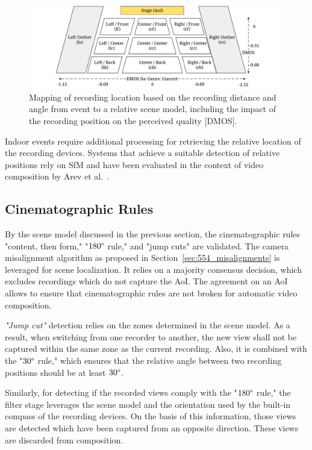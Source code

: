 \begin{figure}
	\centering
	\includegraphics[width=\linewidth]{./gfx/600_Composition/OrientationLocation}%
	\caption[Scene model used for the video composition]{Mapping of recording location based on the recording distance and angle from event to a relative scene model, including the impact of the recording position on the perceived quality [\ac{DMOS}].}
	\label{fig:617_ac_location}
\end{figure}
Indoor events require additional processing for retrieving the relative location of the recording devices.
Systems that achieve a suitable detection of relative positions rely on \acf{SfM} and have been evaluated in the context of video composition by Arev et al.~\cite{Arev2014}.
\subsection{Cinematographic Rules}
By the scene model discussed in the previous section, the cinematographic rules "content, then form," "$180\degree$ rule," and "jump cuts" are validated.
The camera misalignment algorithm as proposed in Section~\ref{sec:554_misalignments} is leveraged for scene localization.
It relies on a majority consensus decision, which excludes recordings which do not capture the \ac{AoI}.
The agreement on an \ac{AoI} allows to ensure that cinematographic rules are not broken for automatic video composition.

\emph{"Jump cut"} detection relies on the zones determined in the scene model.
As a result, when switching from one recorder to another, the new view shall not be captured within the same zone as the current recording.
Also, it is combined with the "$30\degree$ rule," which ensures that the relative angle between two recording positions should be at least $30\degree$.

Similarly, for detecting if the recorded views comply with the "$180\degree$ rule," the filter stage leverages the scene model and the orientation used by the built-in compass of the recording devices.
On the basis of this information, those views are detected which have been captured from an opposite direction.
These views are discarded from composition.